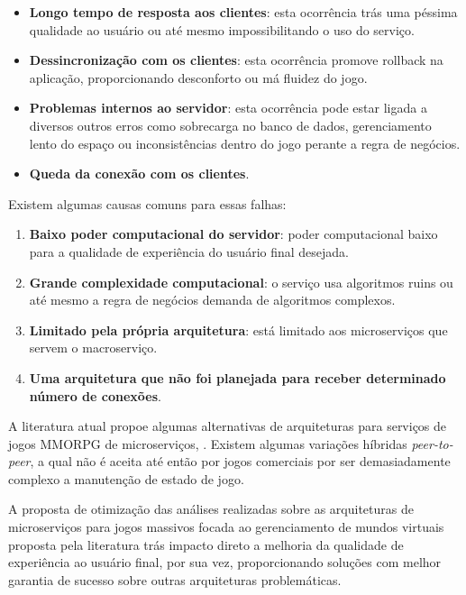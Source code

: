 \begin{itemize}
  \item \textbf{Longo tempo de resposta aos clientes}: esta ocorrência trás uma péssima qualidade ao usuário ou até mesmo impossibilitando o uso do serviço.
  \item \textbf{Dessincronização com os clientes}: esta ocorrência promove rollback na aplicação, proporcionando desconforto ou má fluidez do jogo.
  \item \textbf{Problemas internos ao servidor}: esta ocorrência pode estar ligada a diversos outros erros como sobrecarga no banco de dados, gerenciamento lento do espaço ou inconsistências dentro do jogo perante a regra de negócios.
  \item \textbf{Queda da conexão com os clientes}.
\end{itemize}

Existem algumas causas comuns para essas falhas:

\begin{enumerate}
  \item \textbf{Baixo poder computacional do servidor}: poder computacional baixo para a qualidade de experiência do usuário final desejada.
  \item \textbf{Grande complexidade computacional}: o serviço usa algoritmos ruins ou até mesmo a regra de negócios demanda de algoritmos complexos.
  \item \textbf{Limitado pela própria arquitetura}: está limitado aos microserviços que servem o macroserviço.
  \item \textbf{Uma arquitetura que não foi planejada para receber determinado número de conexões}.
\end{enumerate}

A literatura atual propoe algumas alternativas de arquiteturas para serviços de jogos MMORPG de microserviços, \cite{stephenclarkewillson2017} \cite{albion_online_unite}. Existem algumas variações híbridas \textit{peer-to-peer}, a qual não é aceita até então por jogos comerciais por ser demasiadamente complexo a manutenção de estado de jogo.

A proposta de otimização das análises realizadas sobre as arquiteturas de microserviços para jogos massivos focada ao gerenciamento de mundos virtuais proposta pela literatura trás impacto direto a melhoria da qualidade de experiência ao usuário final, por sua vez, proporcionando soluções com melhor garantia de sucesso sobre outras arquiteturas problemáticas.
